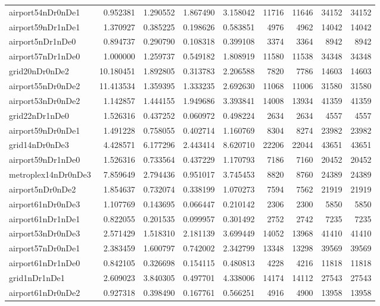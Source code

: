 \begin{longtable}{|l|r|r|r|r|r|r|r|r|}
airport54nDr0nDe1 & 0.952381 & 1.290552 & 1.867490 & 3.158042 & 11716 & 11646 & 34152 & 34152 \\
airport59nDr1nDe1 & 1.370927 & 0.385225 & 0.198626 & 0.583851 & 4976 & 4962 & 14042 & 14042 \\
airport5nDr1nDe0 & 0.894737 & 0.290790 & 0.108318 & 0.399108 & 3374 & 3364 & 8942 & 8942 \\
airport57nDr1nDe0 & 1.000000 & 1.259737 & 0.549182 & 1.808919 & 11580 & 11538 & 34348 & 34348 \\
grid20nDr0nDe2 & 10.180451 & 1.892805 & 0.313783 & 2.206588 & 7820 & 7786 & 14603 & 14603 \\
airport55nDr0nDe2 & 11.413534 & 1.359395 & 1.333235 & 2.692630 & 11068 & 11006 & 31580 & 31580 \\
airport53nDr0nDe2 & 1.142857 & 1.444155 & 1.949686 & 3.393841 & 14008 & 13934 & 41359 & 41359 \\
grid22nDr1nDe0 & 1.526316 & 0.437252 & 0.060972 & 0.498224 & 2634 & 2634 & 4557 & 4557 \\
airport59nDr0nDe1 & 1.491228 & 0.758055 & 0.402714 & 1.160769 & 8304 & 8274 & 23982 & 23982 \\
grid14nDr0nDe3 & 4.428571 & 6.177296 & 2.443414 & 8.620710 & 22206 & 22044 & 43651 & 43651 \\
airport59nDr1nDe0 & 1.526316 & 0.733564 & 0.437229 & 1.170793 & 7186 & 7160 & 20452 & 20452 \\
metroplex14nDr0nDe3 & 7.859649 & 2.794436 & 0.951017 & 3.745453 & 8820 & 8760 & 24389 & 24389 \\
airport5nDr0nDe2 & 1.854637 & 0.732074 & 0.338199 & 1.070273 & 7594 & 7562 & 21919 & 21919 \\
airport61nDr0nDe3 & 1.107769 & 0.143695 & 0.066447 & 0.210142 & 2306 & 2300 & 5850 & 5850 \\
airport61nDr1nDe1 & 0.822055 & 0.201535 & 0.099957 & 0.301492 & 2752 & 2742 & 7235 & 7235 \\
airport53nDr0nDe3 & 2.571429 & 1.518310 & 2.181139 & 3.699449 & 14052 & 13968 & 41410 & 41410 \\
airport57nDr0nDe1 & 2.383459 & 1.600797 & 0.742002 & 2.342799 & 13348 & 13298 & 39569 & 39569 \\
airport61nDr1nDe0 & 0.842105 & 0.326698 & 0.154115 & 0.480813 & 4228 & 4216 & 11818 & 11818 \\
grid1nDr1nDe1 & 2.609023 & 3.840305 & 0.497701 & 4.338006 & 14174 & 14112 & 27543 & 27543 \\
airport61nDr0nDe2 & 0.927318 & 0.398490 & 0.167761 & 0.566251 & 4916 & 4900 & 13958 & 13958 \\

\end{longtable}
